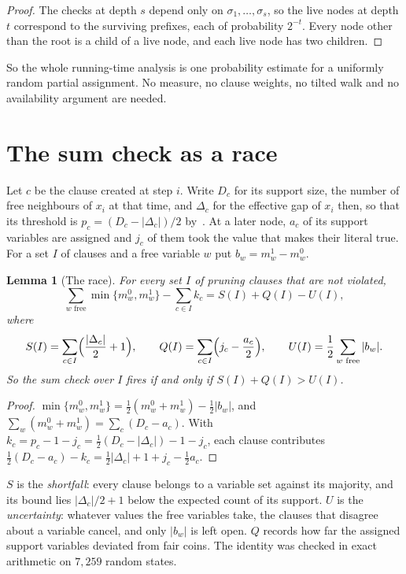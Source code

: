 \documentclass[11pt,a4paper]{article}
\newtheorem{lemma}[theorem]{Lemma}
\theoremstyle{definition}
\theoremstyle{remark}
\begin{document}
\begin{proof}
The checks at depth $s$ depend only on $\sigma_1,\dots,\sigma_s$, so the live
nodes at depth $t$ correspond to the surviving prefixes, each of probability
$2^{-t}$. Every node other than the root is a child of a live node, and each
live node has two children.
\end{proof}

So the whole running-time analysis is one probability estimate for a uniformly
random partial assignment. No measure, no clause weights, no tilted walk and no
availability argument are needed.

\section{The sum check as a race}\label{sec:race}

Let $c$ be the clause created at step $i$. Write $D_c$ for its support size,
the number of free neighbours of $x_i$ at that time, and $\Delta_c$ for the
effective gap of $x_i$ then, so that its threshold is $p_c=(D_c-|\Delta_c|)/2$
by~\cite[(1)]{N3}. At a later node, $a_c$ of its support variables are
assigned and $j_c$ of them took the value that makes their literal true. For a
set $I$ of clauses and a free variable $w$ put $b_w=m^1_w-m^0_w$.

\begin{lemma}[The race]\label{lem:race}
For every set $I$ of pruning clauses that are not violated,
\[
 \sum_{w\text{ free}}\min\{m^0_w,m^1_w\}-\sum_{c\in I}k_c
 =S(I)+Q(I)-U(I),
\]
where
\[
 S(I)=\sum_{c\in I}\Bigl(\frac{|\Delta_c|}2+1\Bigr),\qquad
 Q(I)=\sum_{c\in I}\Bigl(j_c-\frac{a_c}2\Bigr),\qquad
 U(I)=\frac12\sum_{w\text{ free}}|b_w| .
\]
So the sum check over $I$ fires if and only if $S(I)+Q(I)>U(I)$.
\end{lemma}

\begin{proof}
$\min\{m^0_w,m^1_w\}=\frac12(m^0_w+m^1_w)-\frac12|b_w|$, and
$\sum_w(m^0_w+m^1_w)=\sum_c(D_c-a_c)$. With
$k_c=p_c-1-j_c=\frac12(D_c-|\Delta_c|)-1-j_c$, each clause contributes
$\frac12(D_c-a_c)-k_c=\frac12|\Delta_c|+1+j_c-\frac12a_c$.
\end{proof}

$S$ is the \emph{shortfall}: every clause belongs to a variable set against
its majority, and its bound lies $|\Delta_c|/2+1$ below the expected count of
its support. $U$ is the \emph{uncertainty}: whatever values the free variables
take, the clauses that disagree about a variable cancel, and only $|b_w|$ is
left open. $Q$ records how far the assigned support variables deviated from
fair coins. The identity was checked in exact arithmetic on $7{,}259$ random
states.
\end{document}
